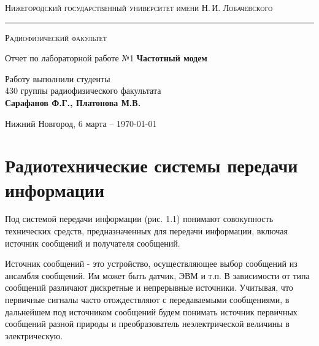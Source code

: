 ﻿\documentclass[a4paper,12pt]{article}
\def\labauthor{Сарафанов Ф.Г., Платонова М.В.}
\def\labnumber{1}
\def\labtheme{Частотный модем}
\begin{document}
\begin{titlepage}
\begin{center}

{\textsc{Нижегородский государственный университет имени Н.\,И. Лобачевского}}
\vskip 2pt \hrule \vskip 3pt
{\textsc{Радиофизический факультет}}

\vfill


{{\LARGE Отчет по лабораторной работе №\labnumber}\vskip 12pt {\Huge \bfseries \labtheme}}

	
\vspace{2cm}
{\large Работу выполнили студенты \\[-0.25em] 430 группы радиофизического факультата \\[0.5em] {\Large \bfseries \labauthor}}



\end{center}

\vfill
	
	
	
\begin{center}
	{Нижний Новгород, 6 марта -- \today}
\end{center}

\end{titlepage}
\tableofcontents
\newpage
\section{Радиотехнические системы передачи информации}

Под системой передачи информации (рис.	1.1) понимают совокупность
технических средств, предназначенных для передачи информации, включая источник сообщений и получателя сообщений.

Источник сообщений - это устройство, осуществляющее выбор сообщений из ансамбля сообщений. Им может быть датчик, ЭВМ и т.п. В зависимости от типа сообщений различают дискретные и непрерывные источники. Учитывая, что первичные сигналы часто отождествляют с передаваемыми сообщениями, в дальнейшем под источником сообщений будем понимать источник первичных сообщений разной природы и преобразователь неэлектрической величины в электрическую.
\end{document}
